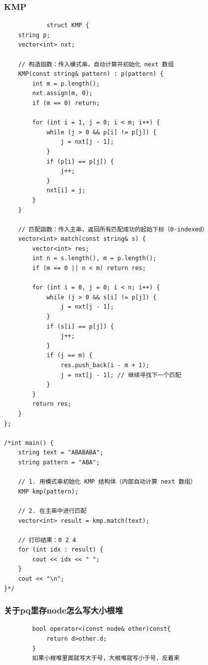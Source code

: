 \documentclass[10pt, a4paper, twocolumn]{article} %
\begin{document}
    \subsubsection{KMP}
    \begin{lstlisting}
    		struct KMP {
    string p;
    vector<int> nxt;

    // 构造函数：传入模式串，自动计算并初始化 next 数组
    KMP(const string& pattern) : p(pattern) {
        int m = p.length();
        nxt.assign(m, 0);
        if (m == 0) return;
        
        for (int i = 1, j = 0; i < m; i++) {
            while (j > 0 && p[i] != p[j]) {
                j = nxt[j - 1];
            }
            if (p[i] == p[j]) {
                j++;
            }
            nxt[i] = j;
        }
    }

    // 匹配函数：传入主串，返回所有匹配成功的起始下标（0-indexed）
    vector<int> match(const string& s) {
        vector<int> res;
        int n = s.length(), m = p.length();
        if (m == 0 || n < m) return res;

        for (int i = 0, j = 0; i < n; i++) {
            while (j > 0 && s[i] != p[j]) {
                j = nxt[j - 1];
            }
            if (s[i] == p[j]) {
                j++;
            }
            if (j == m) {
                res.push_back(i - m + 1);
                j = nxt[j - 1]; // 继续寻找下一个匹配
            }
        }
        return res;
    }
};

/*int main() {
    string text = "ABABABA";
    string pattern = "ABA";

    // 1. 用模式串初始化 KMP 结构体（内部自动计算 next 数组）
    KMP kmp(pattern);

    // 2. 在主串中进行匹配
    vector<int> result = kmp.match(text);

    // 打印结果：0 2 4
    for (int idx : result) {
        cout << idx << " ";
    }
    cout << "\n";
}*/

    \end{lstlisting}
     \subsubsection{关于pq里存node怎么写大小根堆}
    \begin{lstlisting}
    	bool operator<(const node& other)const{
			return d>other.d;
		}
        如果小根堆里面就写大于号，大根堆就写小于号，反着来
    \end{lstlisting}
\end{document}
